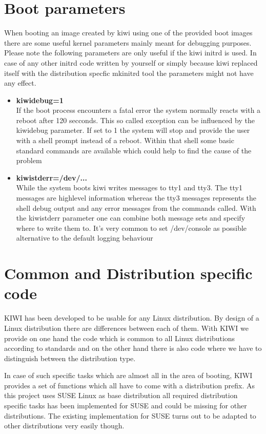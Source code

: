 \section{Boot parameters}
When booting an image created by kiwi using one of the provided
boot images there are some useful kernel parameters mainly meant
for debugging purposes. Please note the following parameters are
only useful if the kiwi initrd is used. In case of any other
initrd code written by yourself or simply because kiwi replaced
itself with the distribution specfic mkinitrd tool the parameters
might not have any effect.

\begin{itemize}
\item \textbf{kiwidebug=1}\\
      If the boot process encounters a fatal error the system normally
      reacts with a reboot after 120 secconds. This so called exception
      can be influenced by the kiwidebug parameter. If set to 1 the system
      will stop and provide the user with a shell prompt instead of a
      reboot. Within that shell some basic standard commands are
      available which could help to find the cause of the problem
\item \textbf{kiwistderr=/dev/...}\\
      While the system boots kiwi writes messages to tty1 and tty3. The
      tty1 messages are highlevel information whereas the tty3 messages
      represents the shell debug output and any error messages from
      the commands called. With the kiwistderr parameter one can combine
      both message sets and specify where to write them to. It's very
      common to set /dev/console as possible alternative to the default
      logging behaviour
\end{itemize}

\section{Common and Distribution specific code}
KIWI has been developed to be usable for any Linux distribution.
By design of a Linux distribution there are differences between
each of them. With KIWI we provide on one hand the code which
is common to all Linux distributions according to standards and
on the other hand there is also code where we have to distinguish
between the distribution type.

In case of such specific tasks which are almost all in the area
of booting, KIWI provides a set of functions which all have to come
with a distribution prefix. As this project uses SUSE Linux as
base distribution all required distribution specific tasks has been
implemented for SUSE and could be missing for other distributions.
The existing implementation for SUSE turns out to be adapted to other
distributions very easily though.

